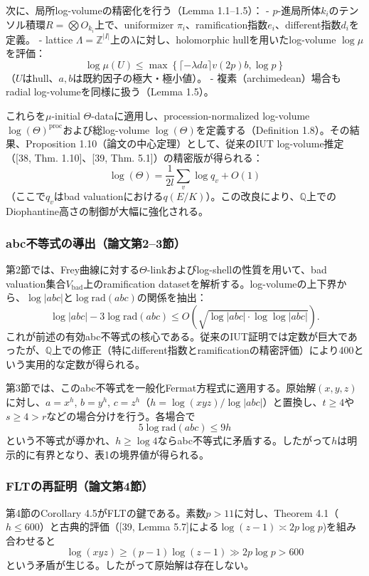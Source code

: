 \documentclass[a4paper,12pt,notitlepage]{jsreport}
\begin{document}
次に、局所log-volumeの精密化を行う（Lemma 1.1–1.5）：
- \(p\)-進局所体\(k_i\)のテンソル積環\(R = \bigotimes O_{k_i}\)上で、uniformizer \(\pi_i\)、ramification指数\(e_i\)、different指数\(d_i\)を定義。
- lattice \(\Lambda = \mathbb{Z}^{|I|}\)上の\(\lambda\)に対し、holomorphic hullを用いたlog-volume \(\log\mu\)を評価：
  \[
  \log\mu(U) \leq \max\left\{ \lceil -\lambda d a \rceil v(2p) b, \log p \right\}
  \]
  （\(U\)はhull、\(a,b\)は既約因子の極大・極小値）。
- 複素（archimedean）場合もradial log-volumeを同様に扱う（Lemma 1.5）。

これらを\(\mu\)-initial \(\Theta\)-dataに適用し、procession-normalized log-volume \(\log(\Theta)^{\mathrm{proc}}\)および総log-volume \(\log(\Theta)\)を定義する（Definition 1.8）。その結果、Proposition 1.10（論文の中心定理）として、従来のIUT log-volume推定（[38, Thm. 1.10]、[39, Thm. 5.1]）の精密版が得られる：
\[
\log(\Theta) = \frac{1}{2l} \sum_{v} \log q_v + O(1)
\]
（ここで\(q_v\)はbad valuationにおける\(q(E/K)\)）。この改良により、\(\mathbb{Q}\)上でのDiophantine高さの制御が大幅に強化される。

\subsubsection{abc不等式の導出（論文第2–3節）}
第2節では、Frey曲線に対する\(\Theta\)-linkおよびlog-shellの性質を用いて、bad valuation集合\(V_{\mathrm{bad}}\)上のramification datasetを解析する。log-volumeの上下界から、\(\log|abc|\)と\(\log\mathrm{rad}(abc)\)の関係を抽出：
\[
\log|abc| - 3\log\mathrm{rad}(abc) \leq O(\sqrt{\log|abc| \cdot \log\log|abc|}).
\]
これが前述の有効abc不等式の核心である。従来のIUT証明では定数が巨大であったが、\(\mathbb{Q}\)上での修正（特にdifferent指数とramificationの精密評価）により400という実用的な定数が得られる。

第3節では、このabc不等式を一般化Fermat方程式に適用する。原始解\((x,y,z)\)に対し、\(a = x^h\), \(b = y^h\), \(c = z^h\)（\(h = \log(xyz)/\log|abc|\)）と置換し、\(t \geq 4\)や\(s \geq 4 > r\)などの場合分けを行う。各場合で
\[
5\log\mathrm{rad}(abc) \leq 9h
\]
という不等式が導かれ、\(h \geq \log 4\)ならabc不等式に矛盾する。したがって\(h\)は明示的に有界となり、表1の境界値が得られる。

\subsubsection{FLTの再証明（論文第4節）}
第4節のCorollary 4.5がFLTの鍵である。素数\(p > 11\)に対し、Theorem 4.1（\(h \leq 600\)）と古典的評価（[39, Lemma 5.7]による\(\log(z-1) \asymp 2p\log p\))を組み合わせると
\[
\log(xyz) \geq (p-1)\log(z-1) \gg 2p\log p > 600
\]
という矛盾が生じる。したがって原始解は存在しない。
\end{document}
